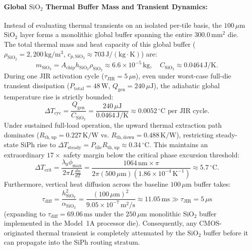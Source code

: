 \documentclass[journal]{IEEEtran}
\begin{document}
\paragraph{\textbf{Global $\mathrm{SiO_2}$ Thermal Buffer Mass and Transient Dynamics:}}
Instead of evaluating thermal transients on an isolated per-tile basis, the $100\,\mu\mathrm{m}$ $\mathrm{SiO_2}$ layer forms a monolithic global buffer spanning the entire $300.0\,\mathrm{mm}^2$ die. The total thermal mass and heat capacity of this global buffer ($\rho_{\mathrm{SiO}_2} = 2{,}200\,\mathrm{kg/m^3}$, $c_{p,\mathrm{SiO}_2} \approx 703\,\mathrm{J/(kg\cdot K)}$) are:
\begin{equation}
m_{\mathrm{SiO}_2} = A_{\mathrm{chip}} h_{\mathrm{SiO}_2} \rho_{\mathrm{SiO}_2} \approx 6.6 \times 10^{-5}\,\mathrm{kg}, \quad C_{\mathrm{SiO}_2} \approx 0.0464\,\mathrm{J/K}.
\end{equation}
During one JIR activation cycle ($\tau_{\mathrm{JIR}} = 5\,\mu\mathrm{s}$), even under worst-case full-die transient dissipation ($P_{\mathrm{total}} = 48\,\mathrm{W}$, $Q_{\mathrm{gen}} = 240\,\mu\mathrm{J}$), the adiabatic global temperature rise is strictly bounded:
\begin{equation}
\Delta T_{\mathrm{cyc}} = \frac{Q_{\mathrm{gen}}}{C_{\mathrm{SiO}_2}} = \frac{240\,\mu\mathrm{J}}{0.0464\,\mathrm{J/K}} \approx 0.0052\,^\circ\mathrm{C}\text{ per JIR cycle}.
\end{equation}
Under sustained full-load operation, the upward thermal extraction path dominates ($R_{\mathrm{th,up}} = 0.227\,\mathrm{K/W}$ vs. $R_{\mathrm{th,down}} = 0.488\,\mathrm{K/W}$), restricting steady-state SiPh rise to $\Delta T_{\mathrm{steady}} = P_{\mathrm{tile}} R_{\mathrm{th,up}} \approx 0.34\,^\circ\mathrm{C}$. This maintains an extraordinary $17\times$ safety margin below the critical phase excursion threshold:
\begin{equation}
\Delta T_{\mathrm{crit}} = \frac{\lambda_0 \phi_{\mathrm{max}}}{2\pi L \frac{dn}{dT}} = \frac{1064\,\mathrm{nm} \times \pi}{2\pi (500\,\mu\mathrm{m}) (1.86 \times 10^{-4}\,\mathrm{K}^{-1})} \approx 5.7\,^\circ\mathrm{C}.
\end{equation}
Furthermore, vertical heat diffusion across the baseline $100\,\mu\mathrm{m}$ buffer takes:
\begin{equation}
\tau_{\mathrm{diff}} = \frac{h_{\mathrm{SiO}_2}^2}{\alpha_{\mathrm{SiO}_2}} = \frac{(100\,\mu\mathrm{m})^2}{9.05 \times 10^{-7}\,\mathrm{m^2/s}} \approx 11.05\,\mathrm{ms} \gg \tau_{\mathrm{JIR}} = 5\,\mu\mathrm{s}
\end{equation}
(expanding to $\tau_{\mathrm{diff}} = 69.06\,\mathrm{ms}$ under the $250\,\mu\mathrm{m}$ monolithic $\mathrm{SiO_2}$ buffer implemented in the Model~1A processor die). Consequently, any CMOS-originated thermal transient is completely attenuated by the $\mathrm{SiO_2}$ buffer before it can propagate into the SiPh routing stratum.
\end{document}
